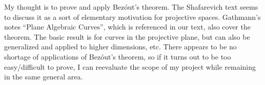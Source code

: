 \documentclass[12pt]{article}
\newcommand{\<}{\langle}
\renewcommand{\>}{\rangle}
\begin{document}
\thispagestyle{title}

My thought is to prove and apply Bez\'out's theorem. The Shafarevich text seems to discuss it as a sort of elementary motivation for projective spaces. Gathmann's notes ``Plane Algebraic Curves'', which is referenced in our text, also cover the theorem. The basic result is for curves in the projective plane, but can also be generalized and applied to higher dimensions, etc. There appears to be no shortage of applications of Bez\'out's theorem, so if it turns out to be too easy/difficult to prove, I can reevaluate the scope of my project while remaining in the same general area. 
\end{document}
